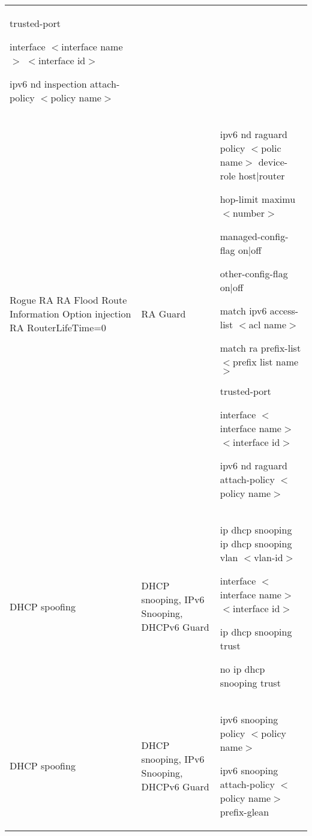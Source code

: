 \begin{longtable}[!htbp]{|L{10em}L{10em}>{\selectfont}L{34em}|}
	\hspace{0.5em}trusted-port
	
	interface $<$interface name$>$ $<$interface id$>$
	
	\hspace{0.5em}ipv6 nd inspection attach-policy  $<$policy name$>$\\
	
	
	
	Rogue RA
	RA Flood
	Route Information Option injection
	RA RouterLifeTime=0
	&RA Guard	&ipv6 nd raguard policy $<$polic name$>$
	device-role host|router
	
	\hspace{0.5em}hop-limit maximu $<$number$>$
	
	\hspace{0.5em}managed-config-flag on|off
	
	\hspace{0.5em}other-config-flag on|off
	
	\hspace{0.5em}match ipv6 access-list $<$acl name$>$
	
	\hspace{0.5em}match ra prefix-list $<$prefix list name$>$
	
	\hspace{0.5em}trusted-port
	
	interface $<$interface name$>$ $<$interface id$>$
	
	\hspace{0.5em}ipv6 nd raguard attach-policy $<$policy name$>$\\
	
	
	
	
	DHCP spoofing	&DHCP snooping, IPv6 Snooping, DHCPv6 Guard	&ip dhcp snooping
	ip dhcp snooping vlan $<$vlan-id$>$ 
	
	interface $<$interface name$>$ $<$interface id$>$
	
	\hspace{0.5em}ip dhcp snooping trust
	
	\hspace{0.5em}no ip dhcp snooping trust\\
	
	
	
	
	DHCP spoofing	&DHCP snooping, IPv6 Snooping, DHCPv6 Guard	&ipv6 snooping policy $<$policy name$>$
	
	\hspace{0.5em}ipv6 snooping attach-policy $<$policy name$>$
	\hspace{0.5em}prefix-glean\\
	

\end{longtable}
